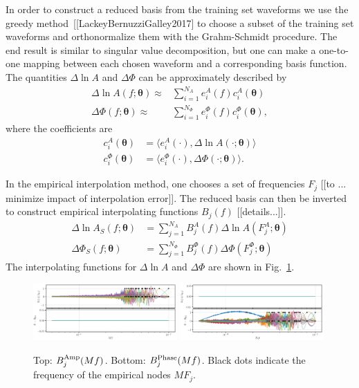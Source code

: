 \documentclass[prd,aps,letter,twocolumn,floatfix,notitlepage]{revtex4-1}
\def\btheta{{\bm \theta}}
\begin{document}
In order to construct a reduced basis from the training set waveforms we use the greedy method~[[LackeyBernuzziGalley2017]
to choose a subset of the training set waveforms and orthonormalize them with the Grahm-Schmidt procedure. The end result
is similar to singular value decomposition, but one can make a one-to-one mapping between each chosen waveform and a 
corresponding basis function. The quantities $\Delta\ln A$ and $\Delta\Phi$ can be approximately described by
\begin{subequations}
\label{eq:basis1}
\begin{align}
\Delta\ln A(f; \btheta) \approx {} & \sum_{i=1}^{N_A} e^A_i(f) c^A_i(\btheta)\\
\Delta\Phi(f; \btheta) \approx {} & \sum_{i=1}^{N_\Phi} e^\Phi_i(f) c^\Phi_i(\btheta),
\end{align}
\end{subequations}
where the coefficients are
\begin{subequations}
\label{eq:basiscoeffs1}
\begin{align}
c_i^A(\btheta) & = \langle e_i^A(\cdot) , \Delta\ln A(\cdot; \btheta) \rangle \\
c_i^\Phi(\btheta) & = \langle e_i^\Phi(\cdot) , \Delta\Phi(\cdot; \btheta) \rangle  .
\end{align}
\end{subequations}

In the empirical interpolation method, one chooses a set of frequencies $F_j$ [[to ... minimize impact of interpolation error]].
The reduced basis can then be inverted to construct empirical interpolating functions $B_j(f)$ [[details...]].
\begin{subequations}
\label{eq:empinterpFinal}
\begin{align}
\Delta\ln A_S(f; \btheta ) & = \sum_{j=1}^{N_A} B_j^A(f) \Delta\ln A(F^A_j; \btheta) \\
\Delta\Phi_S(f; \btheta ) & = \sum_{j=1}^{N_\Phi} B_j^\Phi(f) \Delta\Phi(F^\Phi_j; \btheta)
\end{align}
\end{subequations}
The interpolating functions for $\Delta\ln A$ and $\Delta\Phi$ are shown in Fig.~\ref{fig:B}. 

\begin{figure}[htb]
\centering
\includegraphics[width=0.49\textwidth]{Bamp.png}
\includegraphics[width=0.49\textwidth]{Bphase.png}
\caption{Top: $B^{\rm Amp}_j(Mf)$. Bottom: $B^{\rm Phase}_j(Mf)$. Black dots indicate the frequency of the empirical nodes $MF_j$.}
\label{fig:B}
\end{figure}
\end{document}
